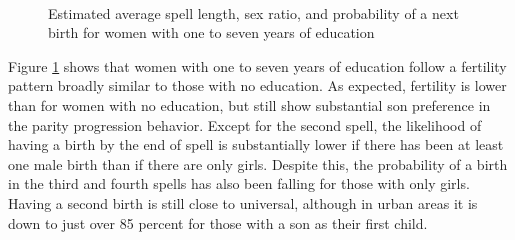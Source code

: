 \documentclass[12pt,letterpaper]{article}
\begin{document}
\begin{figure}[htpb]
\centering
{}
\\
\caption{Estimated average spell length, sex ratio, and probability of 
a next birth for women with one to seven years of education}
\label{fig:bootstrap_med}
\end{figure}

Figure \ref{fig:bootstrap_med} shows that women with one to seven years of education 
follow a fertility pattern broadly similar to those with no education.
As expected, fertility is lower than for women with no education, but still show
substantial son preference in the parity progression behavior.
Except for the second spell, the likelihood of having a birth by the end of spell is
substantially lower if there has been at least one male birth than if there are only girls.
Despite this, the probability of a birth in the third and fourth spells has also been 
falling for those with only girls.
Having a second birth is still close to universal, although in urban areas it is down to
just over 85 percent for those with a son as their first child.
\end{document}
